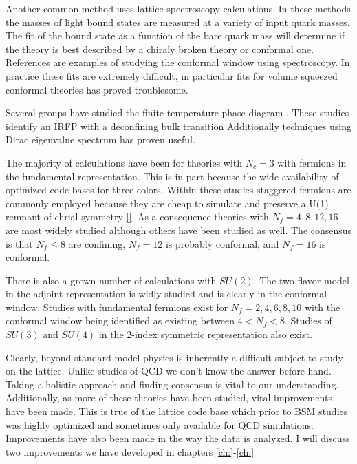 Another common method uses lattice spectroscopy calculations.
In these methods the masses of light bound states are measured at a variety of input quark masses.
The fit of the bound state as a function of the bare quark mass will determine if the theory is best described by a chiraly broken theory or conformal one.
References \cite{125-127} are examples of studying the conformal window using spectroscopy.
In practice these fits are extremely difficult, in particular fits for volume squeezed conformal theories has proved troublesome.

Several groups have studied the finite temperature phase diagram \cite{131}.
These studies identify an IRFP with a deconfining bulk transition
Additionally techniques using Dirac eigenvalue spectrum \cite{130} has proven useful.

The majority of calculations have been for theories with $N_c=3$ with fermions in the fundamental representation.
This is in part because the wide availability of optimized code bases for three colors.
Within these studies staggered fermions are commonly employed because they are cheap to simulate and preserve a U(1) remnant of chrial symmetry \ref{}.
As a consequence theories with $N_f=4,8,12,16$ are most widely studied although others have been studied as well.
The consensus is that $N_f\le8$ are confining, $N_f=12$ is probably conformal, and $N_f=16$ is conformal.

There is also a grown number of calculations with $SU(2)$.
The two flavor model in the adjoint representation is widly studied and is clearly in the conformal window\cite{137-156}.
Studies with fundamental fermions exist for $N_f=2,4,6,8,10$ with the conformal window being identified as existing between $4<N_f<8$.
Studies of $SU(3)$ and $SU(4)$ in the 2-index symmetric representation also exist.

Clearly, beyond standard model physics is inherently a difficult subject to study on the lattice.
Unlike studies of QCD we don't know the answer before hand.
Taking a holistic approach and finding consensus is vital to our understanding.
Additionally, as more of these theories have been studied, vital improvements have been made.
This is true of the lattice code base which prior to BSM studies was highly optimized and sometimes only available for QCD simulations.
Improvements have also been made in the way the data is analyzed.
I will discuss two improvements we have developed in chapters \ref{ch:}-\ref{ch:}
